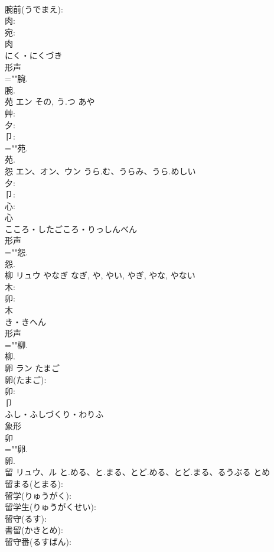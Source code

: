 \documentclass[8pt]{extreport}
\begin{document}
\begin{CJK}{UTF8}{min}
\\	腕前(うでまえ): 
\\	肉: 
\\	宛: 
\\	肉	
\\	にく・にくづき	
\\	形声 
\\	=""腕.
\\	腕.
\\	苑	エン	その, う.つ	あや	
\\	艸: 
\\	夕: 
\\	卩: 
\\	=""苑.
\\	苑.
\\	怨	エン、オン、ウン	うら.む、うらみ、うら.めしい		
\\	夕: 
\\	卩: 
\\	心: 
\\	心	
\\	こころ・したごころ・りっしんべん	
\\	形声 
\\	=""怨.
\\	怨.
\\	柳	リュウ	やなぎ	なぎ, や, やい, やぎ, やな, やない	
\\	木: 
\\	卯: 
\\	木	
\\	き・きへん	
\\	形声 
\\	=""柳.
\\	柳.
\\	卵	ラン	たまご		
\\	卵(たまご): 
\\	卯: 
\\	卩	
\\	ふし・ふしづくり・わりふ	
\\	象形 
\\	卯
\\	=""卵.
\\	卵.
\\	留	リュウ、ル	と.める、と.まる、とど.める、とど.まる、るうぶる	とめ	
\\	留まる(とまる): 
\\	留学(りゅうがく): 
\\	留学生(りゅうがくせい): 
\\	留守(るす): 
\\	書留(かきとめ): 
\\	留守番(るすばん): 

\end{CJK}
\end{document}
